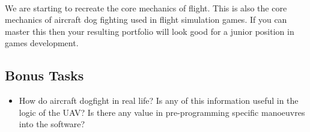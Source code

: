 \documentclass[11pt]{book}
\begin{document}
\paragraph{} We are starting to recreate the core mechanics of flight. This is also the core mechanics of aircraft dog fighting used in flight simulation games. If you can master this then your resulting portfolio will look good for a junior position in games development.

\paragraph{}
\subsection{Bonus Tasks}
\begin{itemize}
\item How do aircraft dogfight in real life? Is any of this information useful in the logic of the UAV? Is there any value in pre-programming specific manoeuvres into the software?
\end{itemize}
\end{document}
